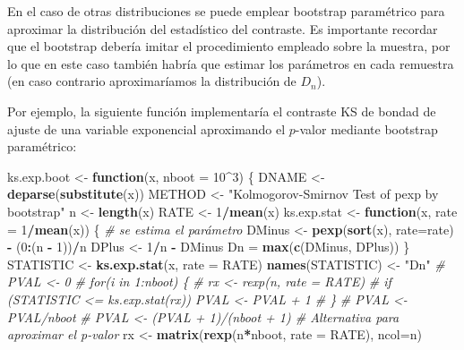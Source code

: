 \documentclass[
]{book}
\newenvironment{Shaded}{\begin{snugshade}}{\end{snugshade}}
\newcommand{\CommentTok}[1]{\textcolor[rgb]{0.56,0.35,0.01}{\textit{#1}}}
\newcommand{\ControlFlowTok}[1]{\textcolor[rgb]{0.13,0.29,0.53}{\textbf{#1}}}
\newcommand{\DataTypeTok}[1]{\textcolor[rgb]{0.13,0.29,0.53}{#1}}
\newcommand{\DecValTok}[1]{\textcolor[rgb]{0.00,0.00,0.81}{#1}}
\newcommand{\KeywordTok}[1]{\textcolor[rgb]{0.13,0.29,0.53}{\textbf{#1}}}
\newcommand{\NormalTok}[1]{#1}
\newcommand{\OperatorTok}[1]{\textcolor[rgb]{0.81,0.36,0.00}{\textbf{#1}}}
\newcommand{\StringTok}[1]{\textcolor[rgb]{0.31,0.60,0.02}{#1}}
\theoremstyle{definition}
\theoremstyle{definition}
\theoremstyle{definition}
\theoremstyle{remark}
\begin{document}
En el caso de otras distribuciones se puede emplear bootstrap paramétrico para
aproximar la distribución del estadístico del contraste.
Es importante recordar que el bootstrap debería imitar el procedimiento
empleado sobre la muestra, por lo que en este caso también habría que estimar
los parámetros en cada remuestra
(en caso contrario aproximaríamos la distribución de \(D_n\)).

Por ejemplo, la siguiente función implementaría el contraste KS de
bondad de ajuste de una variable exponencial aproximando el
\(p\)-valor mediante bootstrap paramétrico:

\begin{Shaded}
\begin{Highlighting}[]
\NormalTok{ks.exp.boot <-}\StringTok{ }\ControlFlowTok{function}\NormalTok{(x, }\DataTypeTok{nboot =} \DecValTok{10}\OperatorTok{^}\DecValTok{3}\NormalTok{) \{}
\NormalTok{  DNAME <-}\StringTok{ }\KeywordTok{deparse}\NormalTok{(}\KeywordTok{substitute}\NormalTok{(x))}
\NormalTok{  METHOD <-}\StringTok{ "Kolmogorov-Smirnov Test of pexp by bootstrap"} 
\NormalTok{  n <-}\StringTok{ }\KeywordTok{length}\NormalTok{(x)}
\NormalTok{  RATE <-}\StringTok{ }\DecValTok{1}\OperatorTok{/}\KeywordTok{mean}\NormalTok{(x)}
\NormalTok{  ks.exp.stat <-}\StringTok{ }\ControlFlowTok{function}\NormalTok{(x, }\DataTypeTok{rate =} \DecValTok{1}\OperatorTok{/}\KeywordTok{mean}\NormalTok{(x)) \{ }\CommentTok{# se estima el parámetro}
\NormalTok{    DMinus <-}\StringTok{ }\KeywordTok{pexp}\NormalTok{(}\KeywordTok{sort}\NormalTok{(x), }\DataTypeTok{rate=}\NormalTok{rate) }\OperatorTok{-}\StringTok{ }\NormalTok{(}\DecValTok{0}\OperatorTok{:}\NormalTok{(n }\OperatorTok{-}\StringTok{ }\DecValTok{1}\NormalTok{))}\OperatorTok{/}\NormalTok{n}
\NormalTok{    DPlus <-}\StringTok{ }\DecValTok{1}\OperatorTok{/}\NormalTok{n }\OperatorTok{-}\StringTok{ }\NormalTok{DMinus}
\NormalTok{    Dn =}\StringTok{ }\KeywordTok{max}\NormalTok{(}\KeywordTok{c}\NormalTok{(DMinus, DPlus))}
\NormalTok{  \}  }
\NormalTok{  STATISTIC <-}\StringTok{ }\KeywordTok{ks.exp.stat}\NormalTok{(x, }\DataTypeTok{rate =}\NormalTok{ RATE) }
  \KeywordTok{names}\NormalTok{(STATISTIC) <-}\StringTok{ "Dn"}
  \CommentTok{# PVAL <- 0}
  \CommentTok{# for(i in 1:nboot) \{}
  \CommentTok{#   rx <- rexp(n, rate = RATE)}
  \CommentTok{#   if (STATISTIC <= ks.exp.stat(rx)) PVAL <- PVAL + 1}
  \CommentTok{# \}}
  \CommentTok{# PVAL <- PVAL/nboot}
  \CommentTok{# PVAL <- (PVAL + 1)/(nboot + 1) # Alternativa para aproximar el p-valor}
\NormalTok{  rx <-}\StringTok{ }\KeywordTok{matrix}\NormalTok{(}\KeywordTok{rexp}\NormalTok{(n}\OperatorTok{*}\NormalTok{nboot, }\DataTypeTok{rate =}\NormalTok{ RATE), }\DataTypeTok{ncol=}\NormalTok{n)}

\end{Highlighting}
\end{Shaded}
\end{document}

